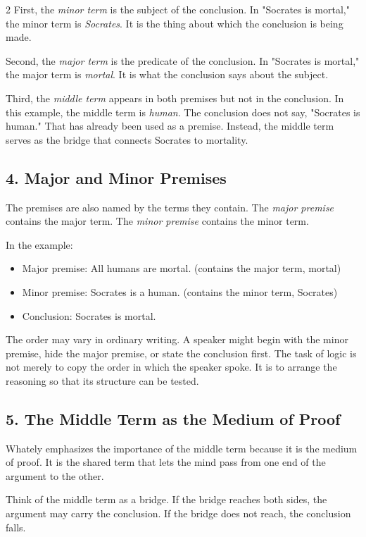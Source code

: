 \documentclass[12pt]{article}
\begin{document}
\begin{multicols}{2}
First, the \textit{minor term} is the subject of the conclusion. In "Socrates is mortal," the minor term is \textit{Socrates}. It is the thing about which the conclusion is being made.

Second, the \textit{major term} is the predicate of the conclusion. In "Socrates is mortal," the major term is \textit{mortal}. It is what the conclusion says about the subject.

Third, the \textit{middle term} appears in both premises but not in the conclusion. In this example, the middle term is \textit{human}. The conclusion does not say, "Socrates is human." That has already been used as a premise. Instead, the middle term serves as the bridge that connects Socrates to mortality.

\subsection*{4. Major and Minor Premises}
The premises are also named by the terms they contain. The \textit{major premise} contains the major term. The \textit{minor premise} contains the minor term.

In the example:

\begin{itemize}[leftmargin=*]
\item Major premise: All humans are mortal. (contains the major term, mortal)
\item Minor premise: Socrates is a human. (contains the minor term, Socrates)
\item Conclusion: Socrates is mortal.
\end{itemize}

The order may vary in ordinary writing. A speaker might begin with the minor premise, hide the major premise, or state the conclusion first. The task of logic is not merely to copy the order in which the speaker spoke. It is to arrange the reasoning so that its structure can be tested.

\subsection*{5. The Middle Term as the Medium of Proof}
Whately emphasizes the importance of the middle term because it is the medium of proof. It is the shared term that lets the mind pass from one end of the argument to the other.

Think of the middle term as a bridge. If the bridge reaches both sides, the argument may carry the conclusion. If the bridge does not reach, the conclusion falls.


\end{multicols}
\end{document}
